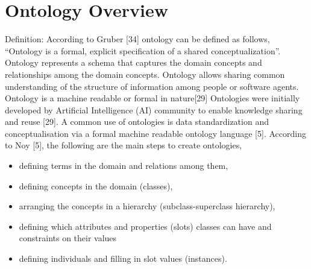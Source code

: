 \section{Ontology Overview}
\label{sec:OntOverview}
\vspace{-.3cm}
Definition: According to Gruber [34] ontology can be defined as follows, 
“Ontology is a formal, explicit specification of a shared conceptualization”.
Ontology represents a schema that captures the domain concepts and relationships among the domain concepts. Ontology allows sharing common understanding of the structure of information among people or software agents. Ontology is a machine readable or formal in nature[29] Ontologies were initially developed by Artificial Intelligence (AI) community to enable knowledge sharing and reuse [29]. 
A common use of ontologies is data standardization and conceptualisation via a formal machine readable ontology language [5]. 
According to Noy [5], the following are the main steps to create ontologies,
\begin{itemize}
  \item defining terms in the domain and relations among them,
  \item defining concepts in the domain (classes),
  \item arranging the concepts in a hierarchy (subclass-superclass hierarchy),
  \item defining which attributes and properties (slots) classes can have and
  constraints on their values
  \item defining individuals and filling in slot values (instances).
\end{itemize}

